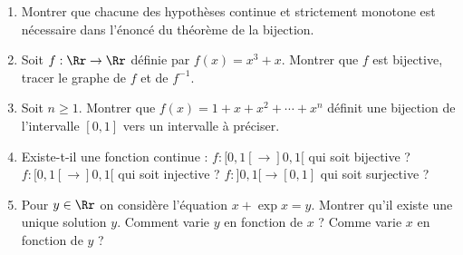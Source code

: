 \documentclass[class=report,crop=false]{standalone}
\begin{document}

\begin{miniexercices}
\sauteligne
\begin{enumerate}
  \item Montrer que chacune des hypothèses \og continue \fg{}  et \og strictement monotone \fg{}
  est nécessaire dans l'énoncé du théorème de la bijection.

  \item Soit $f : \Rr \to \Rr$ définie par $f(x)=x^3+x$. Montrer que $f$ est bijective,
  tracer le graphe de $f$ et de $f^{-1}$.

  \item Soit $n \ge 1$. Montrer que $f(x)=1+x+x^2+\cdots+x^n$ définit une bijection
  de l'intervalle $[0,1]$ vers un intervalle à préciser.


  \item Existe-t-il une fonction continue : $f: [0,1[ \to ]0,1[$ qui soit bijective ?
  $f: [0,1[ \to ]0,1[$ qui soit injective ?  $f: ]0,1[ \to [0,1]$ qui soit surjective ?

  \item Pour $y \in \Rr$ on considère l'équation $x + \exp x =y$.
  Montrer qu'il existe une unique solution $y$. Comment varie $y$ en fonction de $x$ ?
  Comme varie $x$ en fonction de $y$ ?

\end{enumerate}
\end{miniexercices}

\finchapitre
\end{document}
